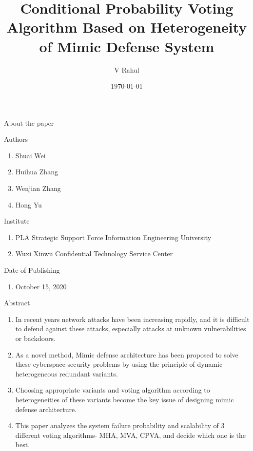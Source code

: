 \documentclass{beamer}
\title{Conditional Probability Voting Algorithm Based on Heterogeneity of Mimic Defense System}
\author{V Rahul}
\institute{IITH}
\date{\today}
\begin{document}
\begin{frame}
    \titlepage
\end{frame}
\begin{frame}{About the paper}
    \begin{block}{Authors}
        \begin{enumerate}[]
            \item Shuai Wei
            \item Huihua Zhang
            \item Wenjian Zhang
            \item Hong Yu
        \end{enumerate}
    \end{block}
    \begin{block}{Institute}
        \begin{enumerate}[]
            \item PLA Strategic Support Force Information Engineering University
            \item Wuxi Xinwu Confidential Technology Service Center
        \end{enumerate}
    \end{block}
    \begin{block}{Date of Publishing}
        \begin{enumerate}[]
            \item October 15, 2020
        \end{enumerate}
    \end{block}
\end{frame}
\begin{frame}{Abstract}
    \begin{block}{}
        \begin{enumerate}
            \item In recent years network attacks have been increasing rapidly, and it is difficult to defend against these attacks, especially attacks at unknown vulnerabilities or backdoors.
            \item As a novel method, Mimic defense architecture has been proposed to solve these cyberspace security problems by using the principle of dynamic heterogeneous redundant variants.
            \item Choosing appropriate variants and voting algorithm according to heterogeneities of these variants become the key issue of designing mimic defense architecture. 
            \item This paper analyzes the system failure probability and scalability of 3 different voting algorithms- MHA, MVA, CPVA, and decide which one is the best.
        \end{enumerate}
    \end{block}
\end{frame}
\end{document}
